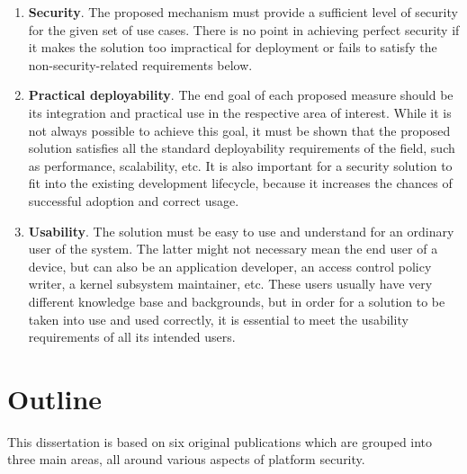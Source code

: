 \begin{enumerate}
	\item \textbf{Security}. The proposed mechanism must provide a sufficient level of security for the given set of use cases. There is no point in achieving perfect security if it makes the solution too impractical for deployment or fails to satisfy the non-security-related requirements below.      
	\item \textbf{Practical deployability}. The end goal of each proposed measure should be its integration and practical use in the respective area of interest. While it is not always possible to achieve this goal, it must be shown that the proposed solution satisfies all the standard deployability requirements of the field, such as performance, scalability, etc. It is also important for a security solution to fit into the existing development lifecycle, because it increases the chances of successful adoption and correct usage. 
	\item \textbf{Usability}.	The solution must be easy to use and understand for an ordinary user of the system. The latter might not necessary mean the end user of a device, but can also be an application developer, an access control policy writer, a kernel subsystem maintainer, etc. These users usually have very different knowledge base and backgrounds, but in order for a solution to be taken into use and used correctly, it is essential to meet the usability requirements of all its intended users. 
\end{enumerate}

\section{Outline}

This dissertation is based on six original publications which are grouped into three main areas, all around various aspects of platform security. 

